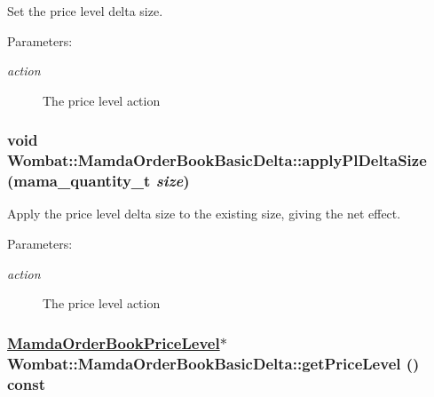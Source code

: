 Set the price level delta size. 

\begin{Desc}
\item[Parameters:]
\begin{description}
\item[{\em action}]The price level action \end{description}
\end{Desc}
\hypertarget{classWombat_1_1MamdaOrderBookBasicDelta_2a3a1aadfd9cb9326943280a63bb7f75}{
\subsubsection[applyPlDeltaSize]{\setlength{\rightskip}{0pt plus 5cm}void Wombat::Mamda\-Order\-Book\-Basic\-Delta::apply\-Pl\-Delta\-Size (mama\_\-quantity\_\-t {\em size})}}
\label{classWombat_1_1MamdaOrderBookBasicDelta_2a3a1aadfd9cb9326943280a63bb7f75}


Apply the price level delta size to the existing size, giving the net effect. 

\begin{Desc}
\item[Parameters:]
\begin{description}
\item[{\em action}]The price level action \end{description}
\end{Desc}
\hypertarget{classWombat_1_1MamdaOrderBookBasicDelta_511d4ed672e4c05354145021890ebf66}{
\subsubsection[getPriceLevel]{\setlength{\rightskip}{0pt plus 5cm}\hyperlink{classWombat_1_1MamdaOrderBookPriceLevel}{Mamda\-Order\-Book\-Price\-Level}$\ast$ Wombat::Mamda\-Order\-Book\-Basic\-Delta::get\-Price\-Level () const}}
\label{classWombat_1_1MamdaOrderBookBasicDelta_511d4ed672e4c05354145021890ebf66}


